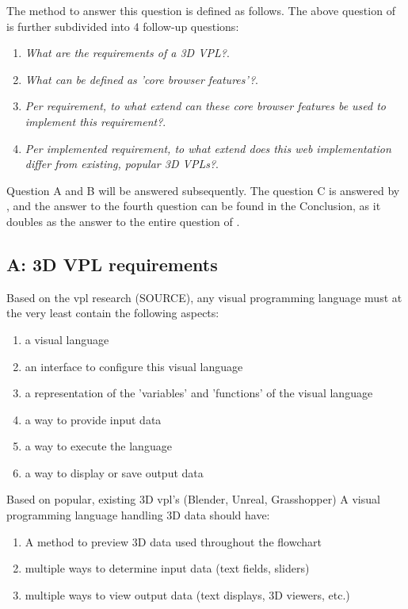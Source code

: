 The method to answer this question is defined as follows. 
The above question of \mySubRQOneTitle is further subdivided into 4 follow-up questions:
\begin{enumerate}[A]
  \item \emph{What are the requirements of a 3D VPL?}.
  \item \emph{What can be defined as 'core browser features'?}.
  \item \emph{Per requirement, to what extend can these core browser features be used to implement this requirement?}.
  \item \emph{Per implemented requirement, to what extend does this web implementation differ from existing, popular 3D VPLs?}.
\end{enumerate}

Question A and B will be answered subsequently. 
The question C is answered by , and the answer to the fourth question can be found in the Conclusion, as it doubles as the answer to the entire question of \mySubRQOneTitle.

\subsection*{A: 3D VPL requirements}

Based on the vpl research (SOURCE), any visual programming language must at the very least contain the following aspects: 
\begin{enumerate}[-]
  \item a visual language
  \item an interface to configure this visual language 
  \item a representation of the 'variables' and 'functions' of the visual language
  \item a way to provide input data 
  \item a way to execute the language
  \item a way to display or save output data
\end{enumerate}

Based on popular, existing 3D vpl's (Blender, Unreal, Grasshopper) A visual programming language handling 3D data should have:
\begin{enumerate}[-]
  \item A method to preview 3D data used throughout the flowchart
  \item multiple ways to determine input data (text fields, sliders) 
  \item multiple ways to view output data (text displays, 3D viewers, etc.)
\end{enumerate}

